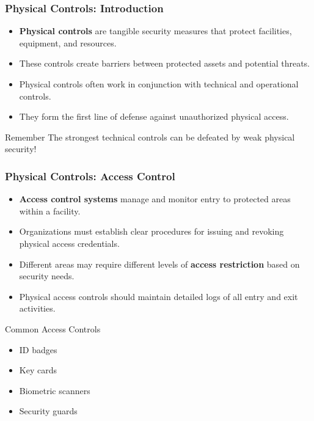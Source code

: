 \documentclass{beamer}
\begin{document}
\begin{frame}
    \frametitle{Physical Controls: Introduction}
    
    \begin{itemize}
        \item \textbf{Physical controls} are tangible security measures that protect facilities, equipment, and resources.
        
        \item These controls create barriers between protected assets and potential threats.
        
        \item Physical controls often work in conjunction with technical and operational controls.
        
        \item They form the first line of defense against unauthorized physical access.
    \end{itemize}
    
    \begin{alertblock}{Remember}
        The strongest technical controls can be defeated by weak physical security!
    \end{alertblock}
\end{frame}

\begin{frame}
    \frametitle{Physical Controls: Access Control}
    
    \begin{itemize}
        \item \textbf{Access control systems} manage and monitor entry to protected areas within a facility.
        
        \item Organizations must establish clear procedures for issuing and revoking physical access credentials.
        
        \item Different areas may require different levels of \textbf{access restriction} based on security needs.
        
        \item Physical access controls should maintain detailed logs of all entry and exit activities.
    \end{itemize}
    
    \begin{exampleblock}{Common Access Controls}
        \begin{itemize}
            \item ID badges
            \item Key cards
            \item Biometric scanners
            \item Security guards
        \end{itemize}
    \end{exampleblock}
\end{frame}
\end{document}
